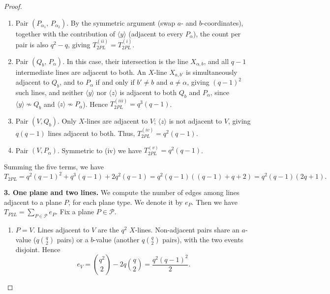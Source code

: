 \documentclass[11pt]{amsart}
\theoremstyle{plain}
\begin{document}
\begin{proof}
\begin{enumerate}
\smallskip

\item[(ii)] Pair $(P_{\alpha_1},\,P_{\alpha_2})$. By the symmetric argument
(swap $a$- and $b$-coordinates), together with the contribution of
$\langle y \rangle$ (adjacent to every $P_\alpha$), the count per pair is
also $q^2-q$, giving $T_{2PL}^{(ii)} = T_{2PL}^{(i)}$.

\smallskip

\item[(iii)] Pair $(Q_b,\,P_\alpha)$. In this case, their intersection is the line $X_{\alpha, b}$, and all $q-1$ intermediate lines are adjacent to both.
An $X$-line $X_{a,b'}$ is simultaneously adjacent to $Q_b$, and to $P_\alpha$
if and only if $b'\neq b$ and $a\neq\alpha$, giving $(q-1)^2$ such lines, and
neither $\langle y \rangle$ nor $\langle z \rangle$ is adjacent to both $Q_b$
and $P_\alpha$, since $\langle y \rangle \not\sim Q_b$ and $\langle z \rangle
\not\sim P_\alpha$). Hence $T_{2PL}^{(iii)} = q^3(q-1)$.  
\smallskip

\item[(iv)] Pair $(V, Q_b)$. Only $X$-lines are adjacent to $V$; $\langle z
\rangle$ is not adjacent to $V$, giving $q(q-1)$ lines adjacent to both. Thus, $T_{2PL}^{(iv)}= q^2(q-1)$.
\smallskip

\item[(v)] Pair $(V, P_\alpha)$. Symmetric to (iv) we have  $T_{2PL}^{(v)}= q^2(q-1)$.
\end{enumerate}
Summing the five terms, we have
\[T_{2PL} = q^2(q-1)^2 + q^3(q-1) + 2q^2(q-1) = q^2(q-1) ((q-1)+q+2) = q^2(q-1)(2q+1).\]

\noindent\textbf{3. One plane and two lines.} We compute the number of edges among lines adjacent to a plane $P$, for each plane type. We denote it by $e_P$. Then we have $T_{P2L}=\sum_{P\in \mathcal{P}} e_P$. Fix a plane $P\in \mathcal{P}$.
\begin{enumerate}
\item[(i)] $P=V$. Lines adjacent to $V$ are the $q^2$ $X$-lines.  Non-adjacent pairs share an $a$-value ($q\binom{q}{2}$ pairs) or a $b$-value (another $q\binom{q}{2}$ pairs), with the two events disjoint.  Hence
\begin{equation}\label{eV-B2}
  e_{V}=\binom{q^2}{2}-2q\binom{q}{2}=\frac{q^2(q-1)^2}{2}.
\end{equation}


\end{enumerate}
\end{proof}
\end{document}
